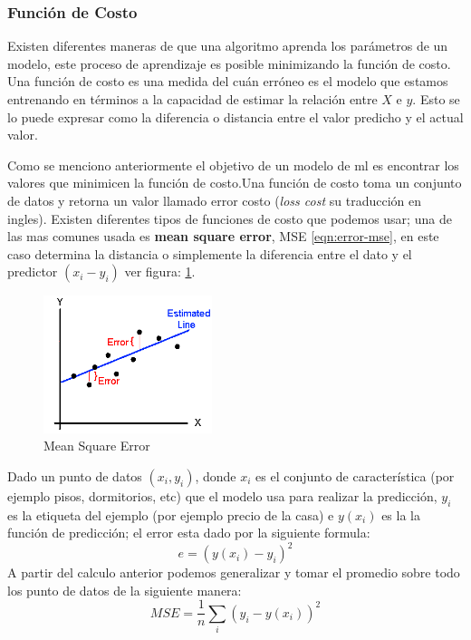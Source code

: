 \subsubsection{Función de Costo}
Existen diferentes maneras de que una algoritmo aprenda los parámetros de un modelo, este proceso de aprendizaje es posible minimizando la función de costo. Una función de costo es una medida del cuán erróneo es el modelo que estamos entrenando en términos a la capacidad de estimar la relación entre $X $ e $y $. Esto se lo puede expresar como la diferencia o distancia entre el valor predicho y el actual valor.

Como se menciono anteriormente el objetivo de un modelo de \ac{ml} es encontrar los valores que minimicen la función de costo.Una función de costo toma un conjunto de datos y retorna un valor llamado error costo (\textit{loss cost} su traducción en ingles). Existen diferentes tipos de funciones de costo que podemos usar; una de las mas comunes usada es \textbf{mean square error}, MSE \ref{eqn:error-mse}, en este caso determina la distancia o simplemente la diferencia entre el dato y el predictor $(x_i - y_i) $ ver figura: \ref{Fig:mse}.
\begin{figure}[H] \centering
  \includegraphics[height=4cm,keepaspectratio=true,clip=true]{imagenes/MarcoTeorico/mse-cost.png}
  \caption{Mean Square Error }\label{Fig:mse}
\end{figure}

Dado un punto de datos $(x_i,y_i) $, donde $x_i $ es el conjunto de característica (por ejemplo pisos, dormitorios, etc) que el modelo usa para realizar la predicción, $y_i $ es la etiqueta del ejemplo (por ejemplo precio de la casa) e $y(x_i)$ es la la función de predicción; el error esta dado por la siguiente formula:
\begin{equation}\label{eqn:error-mse}
e = (y(x_i) - y_i)^2
\end{equation} 
A partir del calculo anterior podemos generalizar y tomar el promedio sobre todo los punto de datos de la siguiente manera:
\begin{equation}
MSE =  \frac{1}{n}\sum_{i}(y_i - y(x_i))^2
\end{equation}


